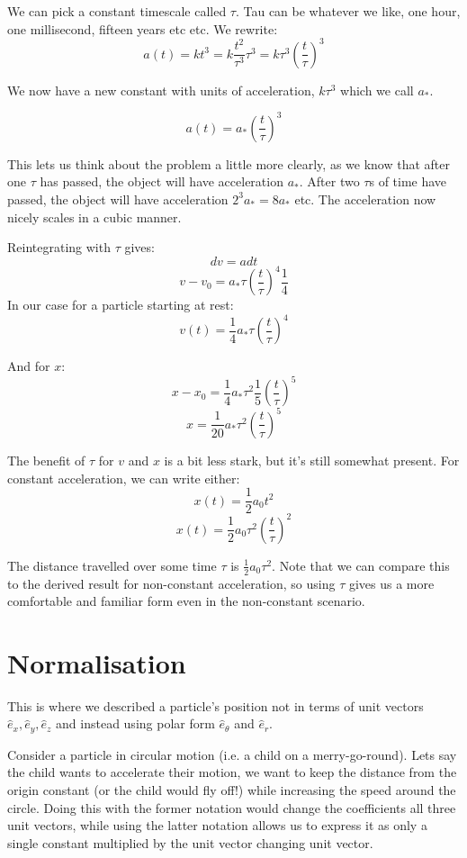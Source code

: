 We can pick a constant timescale called $\tau$. Tau can be whatever we like, one hour, one millisecond, fifteen years etc etc. We rewrite:
\[
    a(t) = kt^3 = k \frac{t^2}{\tau^3} \tau^3 = k \tau^3 \left(\frac{t}{\tau}\right)^3
\]

We now have a new constant with units of acceleration, $k \tau^3$ which we call $a_*$. 

\[
    a(t) = a_* \left(\frac{t}{\tau}\right)^3
\]

This lets us think about the problem a little more clearly, as we know that after one $\tau$ has passed, the object will have acceleration $a_*$. After two $\tau$s of time have passed, the object will have acceleration $2^3 a_* = 8 a_*$ etc. The acceleration now nicely scales in a cubic manner.

Reintegrating with $\tau$ gives:
\[
    dv = a dt
\]
\[
    v - v_0 = a_* \tau \left(\frac{t}{\tau}\right)^4 \frac{1}{4}
\]
In our case for a particle starting at rest:
\[
    v(t) = \frac{1}{4} a_* \tau \left(\frac{t}{\tau}\right)^4
\]

And for $x$:
\[
    x - x_0 = \frac{1}{4} a_* \tau^2 \frac{1}{5} \left(\frac{t}{\tau}\right)^5
\]
\[
    x = \frac{1}{20} a_* \tau^2 \left(\frac{t}{\tau}\right)^5
\]

The benefit of $\tau$ for $v$ and $x$ is a bit less stark, but it's still somewhat present. For constant acceleration, we can write either:
\[
    x(t) = \frac{1}{2} a_0 t^2
\]
\[
    x(t) = \frac{1}{2} a_0 \tau^2 \left(\frac{t}{\tau}\right)^2
\]

The distance travelled over some time $\tau$ is $\frac{1}{2} a_0 \tau^2$. Note that we can compare this to the derived result for non-constant acceleration, so using $\tau$ gives us a more comfortable and familiar form even in the non-constant scenario.

\section{Normalisation}
This is where we described a particle's position not in terms of unit vectors $\hat{e}_x, \hat{e}_y, \hat{e}_z$ and instead using polar form $\hat{e}_\theta$ and $\hat{e}_r$.

Consider a particle in circular motion (i.e. a child on a merry-go-round). Lets say the child wants to accelerate their motion, we want to keep the distance from the origin constant (or the child would fly off!) while increasing the speed around the circle. Doing this with the former notation would change the coefficients all three unit vectors, while using the latter notation allows us to express it as only a single constant multiplied by the unit vector changing unit vector.


